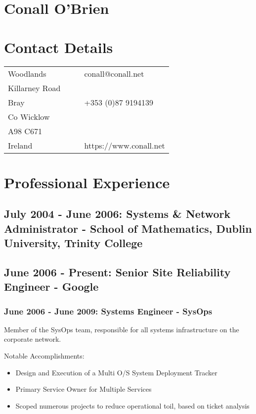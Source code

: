 \documentclass[a4paper, 10pt] {article}
\begin{document}
\section*{Conall O'Brien}

\section*{Contact Details}

\begin{tabular}{l l l l}
Woodlands		&	&			& conall@conall.net 	  	\\
Killarney Road		&	&			&				\\
Bray	 		&	&			& +353 (0)87 9194139 		\\
Co Wicklow		&	&			& 				\\
A98 C671		&	&			& 				\\
Ireland			&  	&			& https://www.conall.net	\\
\end{tabular}

\section*{Professional Experience}

\subsection*{July 2004 - June 2006: Systems \& Network Administrator - School of Mathematics, Dublin University, Trinity College}

\subsection*{June 2006 - Present: Senior Site Reliability Engineer - Google}

\subsubsection*{June 2006 - June 2009: Systems Engineer - SysOps}

Member of the SysOps team, responsible for all systems infrastructure on the corporate network.

Notable Accomplishments:

\begin{itemize}
  \item Design and Execution of a Multi O/S System Deployment Tracker
  \item Primary Service Owner for Multiple Services
  \item Scoped numerous projects to reduce operational toil, based on ticket analysis
\end{itemize}
\end{document}

